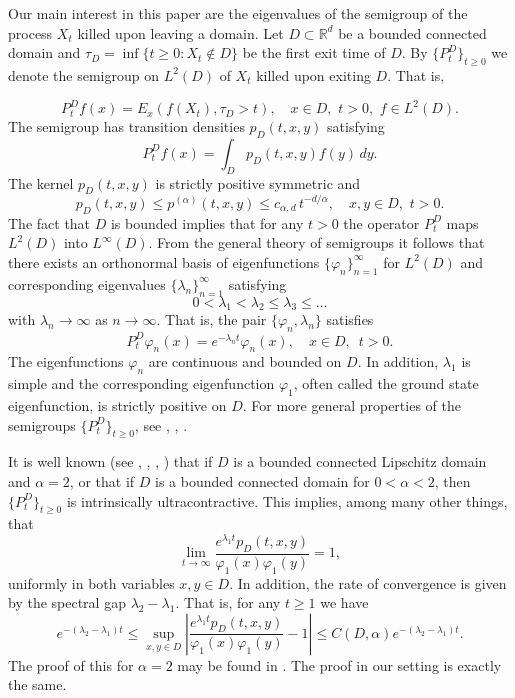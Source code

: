 \documentclass[11pt,leqno]{article}
\theoremstyle{definition}
\newcommand{\Rd}{\mathbb{R}^d}
\numberwithin{equation}{section}
\begin{document}
Our main  interest in this paper are the eigenvalues of the semigroup of the process
$X_t$ killed upon  leaving a domain. Let $D \subset \Rd$ be a bounded connected domain
and $\tau_{D} =
\inf\{t
\ge 0: X_t
\notin D\}$ be the first exit time of $D$.   By $\{P_t^{D}\}_{t \ge 0}$ we denote the semigroup on
$L^2(D)$ of $X_t$ killed upon exiting $D$.  That is, 
 
$$
P_{t}^{D}f(x) = E_{x}(f(X_{t}), \tau_{D} > t), \quad x \in D, \, \, t > 0, \, \, f \in L^2(D).
$$
The semigroup has transition densities $p_D(t,x,y)$ satisfying 
$$
P_{t}^{D}f(x) = \int_{D} p_{D}(t,x,y) f(y) \, dy.
$$
The  kernel $p_{D}(t,x,y)$  is strictly positive
symmetric and
$$
p_{D}(t,x,y) \le p^{(\alpha)}(t,x,y) \le c_{\alpha,d} \, t^{-d/\alpha}, \quad x,y \in D, \, \, t>0.
$$
The fact that $D$ is bounded implies that for any $t > 0$ the operator $P_t^D$ maps $L^2(D)$ into $L^{\infty}(D)$.
From the
general theory of
 semigroups
\cite{Da1} it follows that there exists 
 an   orthonormal basis of eigenfunctions
$\{\varphi_n\}_{n =1}^{\infty}$ for
$L^2(D)$ and corresponding eigenvalues
$\{\lambda_n\}_{n = 1}^{\infty}$ satisfying
$$0<\lambda_1<\lambda_2\leq \lambda_3\leq \dots$$
  with $\lambda_n\to\infty$
as
$n\to\infty$. That is,  the pair $\{\varphi_n, \lambda_n\}$ satisfies
\begin{equation}
\label{cauchyproblem}
P_{t}^{D}\varphi_{n}(x) = e^{-\lambda_{n} t} \varphi_{n}(x), \quad x \in D, \,\,\, t > 0.
\end{equation}
The eigenfunctions $\varphi_n$ are continuous and bounded on $D$. In addition, 
$\lambda_1$ is simple and the corresponding eigenfunction
$\varphi_1$, often called the ground state eigenfunction, is strictly
positive on
$D$.  
 For more general properties of
  the semigroups $\{P_t^D\}_{t \ge 0}$, see
\cite{G1},
\cite{BG2}, \cite{CS1}.


It is well known (see \cite{B}, \cite{CS1}, \cite{CS2}, \cite{K})
that if $D$ is a bounded connected Lipschitz domain and $\alpha = 2$, or that if 
$D$ is a bounded connected domain for $0 < \alpha < 2$, then
$\{P_t^D\}_{t \ge 0}$ is intrinsically ultracontractive.  This implies, among many other things,
that  
$$
\lim_{t \to \infty} \frac{e^{\lambda_1 t} p_D(t,x,y)}{\varphi_1(x) \varphi_1(y)} = 1, 
$$
uniformly in both variables $x, y\in D$.  In addition, the rate of convergence is given by 
the spectral gap $\lambda_2-\lambda_1$. That is, 
for any $t \ge 1$ we have
\begin{equation}
\label{spectralgap}
e^{-(\lambda_2 - \lambda_1) t} \le 
\sup_{x,y \in D} \left|\frac{e^{\lambda_1 t}p_D(t,x,y)}{ \varphi_1(x) \varphi_1(y)} - 1
 \right| \le C(D,\alpha) e^{-(\lambda_2 - \lambda_1)t}.
\end{equation}
The proof of this  for $\alpha=2$ may be found in \cite{Sm}.  
The proof in our setting is exactly the same.  
\end{document}
